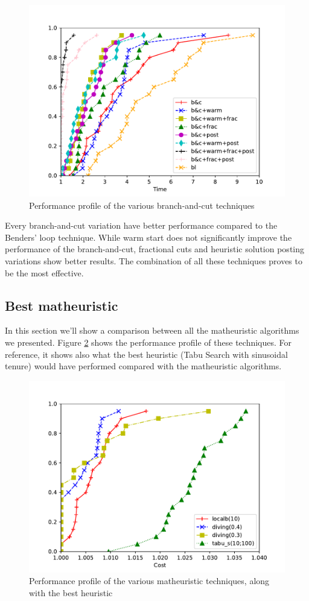\documentclass{article}
\begin{document}
\begin{figure}[ht]
        \caption{Performance profile of the various branch-and-cut techniques}
        \label{fig:ht_bec}
        \centering
        \includegraphics[width=340pt]{assets/ht_bec.pdf}
\end{figure}

Every branch-and-cut variation have better performance compared to the Benders'
loop technique. While warm start does not significantly improve the performance of the
branch-and-cut, fractional cuts and heuristic solution posting variations show better results.
The combination of all these techniques proves to be the most effective.

\clearpage
\newpage

\subsection{Best matheuristic}
In this section we'll show a comparison between all the matheuristic algorithms
we presented.
Figure \ref{fig:math_vs_tabu} shows the performance profile of these techniques.
For reference, it shows also what the best heuristic (Tabu Search with sinusoidal tenure)
would have performed compared with the matheuristic algorithms.

\begin{figure}[ht]
        \caption{Performance profile of the various matheuristic techniques, along with the best heuristic}
        \label{fig:math_vs_tabu}
        \centering
        \includegraphics[width=340pt]{assets/math_vs_tabu.pdf}
\end{figure}
\end{document}
